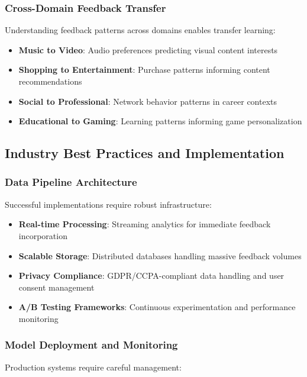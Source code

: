 \subsubsection{Cross-Domain Feedback Transfer}

Understanding feedback patterns across domains enables transfer learning:

\begin{itemize}
    \item \textbf{Music to Video}: Audio preferences predicting visual content interests
    \item \textbf{Shopping to Entertainment}: Purchase patterns informing content recommendations
    \item \textbf{Social to Professional}: Network behavior patterns in career contexts
    \item \textbf{Educational to Gaming}: Learning patterns informing game personalization
\end{itemize}

\subsection{Industry Best Practices and Implementation}

\subsubsection{Data Pipeline Architecture}

Successful implementations require robust infrastructure:

\begin{itemize}
    \item \textbf{Real-time Processing}: Streaming analytics for immediate feedback incorporation
    \item \textbf{Scalable Storage}: Distributed databases handling massive feedback volumes
    \item \textbf{Privacy Compliance}: GDPR/CCPA-compliant data handling and user consent management
    \item \textbf{A/B Testing Frameworks}: Continuous experimentation and performance monitoring
\end{itemize}

\subsubsection{Model Deployment and Monitoring}

Production systems require careful management:

